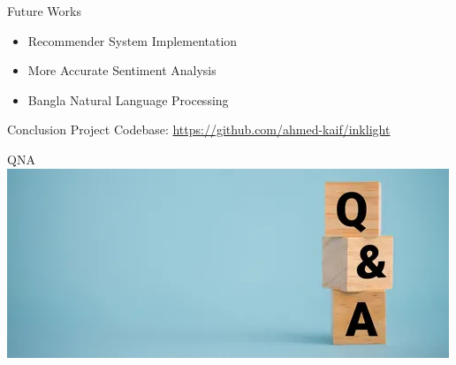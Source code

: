 \documentclass[a4paper]{article}
\begin{document}
	\begin{frame}{Future Works}
		\begin{itemize}
			\item Recommender System Implementation
			\vspace{0.5cm}
			\item More Accurate Sentiment Analysis
			\vspace{0.5cm}
			\item Bangla Natural Language Processing
		\end{itemize}
	\end{frame}
	
	
	\begin{frame}{Conclusion}
		Project Codebase:
		\url{https://github.com/ahmed-kaif/inklight}
	\end{frame}
	
\begin{frame}{QNA}
\includegraphics[width=\textwidth]{qna.png}
\end{frame}
	
\end{document}
